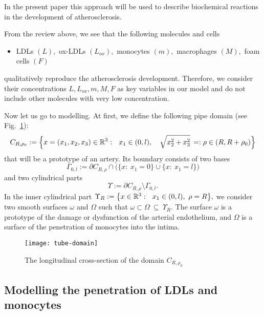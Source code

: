 \documentclass[reqno]{amsart}            %
\numberwithin{equation}{section}
\begin{document}
In the present paper this approach will be used to describe biochemical reactions in the development of atherosclerosis.

From the review above, we see that the following molecules and cells
\begin{itemize}
\item
LDLs $(L),$  ox-LDLs $(L_{ox}),$
monocytes $(m),$  macrophages $(M),$  foam cells $(F)$
\end{itemize}
qualitatively reproduce the atherosclerosis development.
Therefore, we consider their concentrations $L, L_{ox}, m, M, F$ as key variables in our model and do not include other molecules with very low concentration.

Now let us go to modelling. At first, we define the following pipe domain (see Fig.~\ref{f1}):
$$
C_{R,\rho_0} := \Big\{x=(x_1, x_2, x_3) \in \Bbb R^3: \ \ x_1 \in (0, l ) , \quad \sqrt{x_2^2+x_3^2}\, =: \rho \in (R, R+\rho_0) \Big\}
$$
that will be a prototype of an artery. Its boundary consists of two bases
$$
  \Gamma_{0,l}:= \partial C_{R,\rho} \cap \big(\{x: \  x_1=0\}\cup \{x: \  x_1= l\}\big)
$$
and two cylindrical parts
$$
  \Upsilon:= \partial C_{R,\rho} \setminus  \Gamma_{0,l}.
$$
In the inner cylindrical part $\Upsilon_R :=  \big\{x\in \Bbb R^3: \ \ x_1 \in (0, l) , \  \rho = R \big\},$ we consider two
smooth surfaces $\omega$ and $\Omega$ such that
$
\omega \subset \Omega \ \subseteq \ \Upsilon_R.
$
The surface $\omega$ is a prototype of the damage or dysfunction of the arterial endothelium, and $\Omega$ is a surface of
the penetration of monocytes into the intima.

\begin{figure}[htbp]
\centering
\texttt{[image: tube-domain]}
\caption{The longitudinal cross-section of the domain $C_{R,\rho_0}$}\label{f1}
\end{figure}




\subsection{Modelling the penetration of LDLs and monocytes}\label{st-1}
\end{document}
